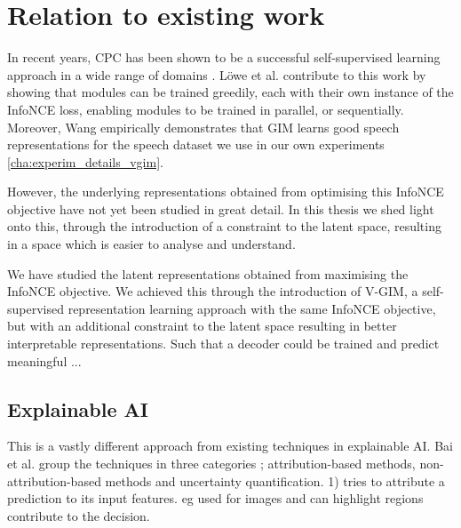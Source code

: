 
\chapter{Relation to existing work}

In recent years, CPC has been shown to be a successful self-supervised learning approach in a wide range of domains \cite{stackeEvaluationContrastivePredictive2020, dehaanContrastivePredictiveCoding2021, luSemiSupervisedHistologyClassification2019, bhatiSegmentalContrastivePredictive2021b, deldariTimeSeriesChange2021, henaffDataEfficientImageRecognition2020}. Löwe et al. contribute to this work by showing that modules can be trained greedily, each with their own instance of the InfoNCE loss, enabling modules to be trained in parallel, or sequentially. Moreover, Wang \cite{meihanwangSpeechRepresentationLearning2019} empirically demonstrates that GIM learns good speech representations for the speech dataset we use in our own experiments \ref{cha:experim_details_vgim}.

However, the underlying representations obtained from optimising this InfoNCE objective have not yet been studied in great detail. In this thesis we shed light onto this, through the introduction of a constraint to the latent space, resulting in a space which is easier to analyse and understand.

We have studied the latent representations obtained from maximising the InfoNCE objective. 
We achieved this through the introduction of V-GIM, a self-supervised representation learning approach with the same InfoNCE objective, but with an additional constraint to the latent space resulting in better interpretable representations. Such that a decoder could be trained and predict meaningful ...




	
\section{Explainable AI}
	This is a vastly different approach from existing techniques in explainable AI. Bai et al. group the techniques in three categories \cite{baiExplainableDeepLearning2021}; attribution-based methods, non-attribution-based methods and uncertainty quantification.
	1) tries to attribute a prediction to its input features. eg used for images and can highlight regions contribute to the decision.
	
